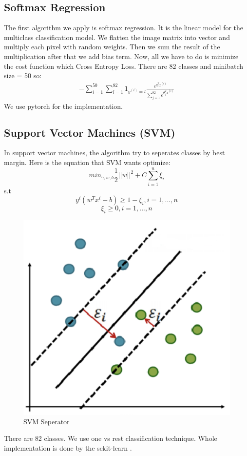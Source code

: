 \documentclass[10pt]{article}
\begin{document}
\subsection{Softmax Regression}
The first algorithm we apply is softmax regression. It is the linear model for the multiclass classification model. We flatten the image matrix into vector and multiply each pixel with random weights. Then we sum the result of the multiplication after that we add bias term. Now, all we have to do is minimize the cost function which Cross Entropy Loss. There are 82 classes and minibatch size = 50 so:
\begin{align}
-\sum_{i=1}^{50} \sum_{l=1}^{82} 1_{y^(i) = l} \frac  {e^{\theta_l^Tx^{(i)}}}{\sum_{j=1}^{82} e^{\theta_j^Tx^{(i)}}}
\label{equation2}
\end{align}
We use pytorch for the implementation.
\subsection{Support Vector Machines (SVM)}
In support vector machines, the algorithm try to seperates classes by best margin. Here is the equation that SVM wants optimize:
$$
min_{\gamma,w,b} \frac{1}{2}|| w||^2 + C \sum^n_{i=1} \xi_i 
$$
s.t
$$
y^{i}(w^Tx^{i} + b) \geq 1 -  \xi_i, i = 1,...,n
$$
$$
\xi_i   \geq 0, i = 1,...,n
$$
\begin{figure}[h]
\centering
\includegraphics[scale=0.15]{SVM}
\caption{SVM Seperator}
\end{figure}
There are 82 classes. We use one vs rest classification technique. Whole implementation is done by the sckit-learn \cite{sckit}.
\end{document}
